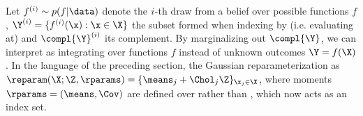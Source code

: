 % 
Let \(f^{(\idx)} \sim p(f | \data)\) denote the \(i\)-th draw from a belief over possible functions \(f\), \(\Y^{(\idx)} = \{f^{(\idx)}(\x) : \x \in \X\}\) the subset formed when indexing by (i.e. evaluating at) \X{} and \(\compl{\Y}^{(\idx)}\) its complement.
% 
By marginalizing out \(\compl{\Y}\), we can interpret \Acq{} as integrating over functions \(f\) instead of unknown outcomes \(\Y = f(\X)\).
% 
In the language of the preceding section,  the Gaussian reparameterization as \(\reparam(\X; \Z, \rparams) = \{\means_{j} + \Chol_{j}\Z\}_{\x_{j} \in \X}\), where moments \(\rparams = (\means, \Cov)\) are defined over \xspace{} rather than \X{}, which now  acts as an index set.
\note{what was $\xspace$ again?}



